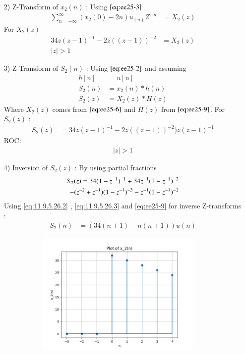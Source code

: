 \documentclass[journal,12pt,twocolumn]{IEEEtran}
\theoremstyle{remark}
\begin{document}
\begin{enumerate}
    \vspace{0.7cm}
\item[2)] 
Z-Transform of $x_2(n)$ :
Using $\eqref{eq:ee25-3}$
\vspace{0.05cm}
\begin{align}
\sum_{n=-\infty}^{\infty}(x_2(0) -2n)u_{(n)}Z^{-n} &= X_2(z)
\end{align}
For $X_2(z)$ 
\begin{align}
  34z(z-1)^{-1}-
       2z((z-1))^{-2} &= X_2(z) \label{eq:ee25-6}\\
    \lvert z\rvert  >  1 
\end{align}
\item[3)]
Z-Transform of $S_2(n)$ :
Using $\eqref{eq:ee25-2}$ and assuming 
\begin{align}
         h[n] &= u[n] \\
    S_2(n) &= x_2(n) * h(n) \\
    S_2(z) &= X_2(z) * H(z)
    \end{align}
    Where $X_2(z)$ comes from $\eqref{eq:ee25-6}$ and $H(z)$ from $\eqref{eq:ee25-9}$.
    \vspace{0.05cm}
    For $S_2(z)$ :
    \begin{align}
            S_2(z) &= 34z(z-1)^{-1}-
       2z((z-1))^{-2})z(z-1)^{-1}
    \end{align}
    ROC:
    \begin{align} 
    \lvert z \rvert > 1
    \end{align}
    
    \item[4)]
Inversion of $S_2(z)$ :
By using partial fractions 
\begin{align}
    S_2(z) = \notag34(1-z^{-1})^{-1} + 34z^{-1}(1-z^{-1})^{-2} \\- (z^{-2} + z^{-1})(1-z^{-1})^{-3} - z^{-1}(1-z^{-1})^{-2}  
\end{align}
Using \eqref{eq:11.9.5.26.2} , \eqref{eq:11.9.5.26.3} and \eqref{eq:ee25-9} for inverse Z-transforms :
\begin{align}
 S_2(n) &= (34(n+1) - n(n+1))u(n)   
\end{align}

\begin{figure}[!ht]
\centering
  \graphicspath{ {figs/} }
\includegraphics[width=10cm, height=6cm]{graph_2}
\captionsetup{Graph:2 $x_2(n)$ vs n }
\label{graph:ee25-g3}
\end{figure}


\end{enumerate}
\end{document}

